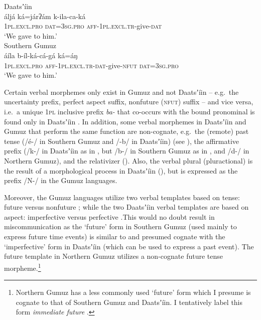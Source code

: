 \documentclass[output=paper]{langsci/langscibook}
\begin{document}
\ea\label{ex:ahlandc:2}
\ea\label{ex:ahlandc:2a} 
Daatsʼíin\\
\gll
áljá                 ká=járʔám        k-ila-ca-ká  \\
\textsc{1pl.excl.pro} \textsc{dat}=\textsc{3sg.pro}   \textsc{aff-1pl.excl.tr-}give-\textsc{dat} \\
\glt ‘We gave to him.’ \\

\ex\label{ex:ahlandc:2b}  
Southern Gumuz \\
\gll
  áíla                 b-íl-ká-cá-gá  ká=áŋ \\
\textsc{1pl.excl.pro} \textsc{aff-1pl.excl.tr-dat-}give-\textsc{nfut}  \textsc{dat=3sg.pro} \\
\glt ‘We gave to him.’
\z
\z

Certain  verbal morphemes only exist in Gumuz and not Daatsʼíin – e.g.\ the uncertainty prefix, perfect aspect suffix, nonfuture (\textsc{nfut)} suffix  \citep{Ahland2012Gumuz} – and  vice versa, i.e.\ a unique 1\textsc{pl} inclusive prefix \textit{ba- }that co-occurs with the bound pronominal is found only in Daatsʼíin . In addition, some verbal morphemes in Daatsʼíin and Gumuz that perform the same function are non-cognate, e.g.\ the (remote) past tense (/é-/ in Southern Gumuz and /-b/ in Daatsʼíin) (see ), the affirmative prefix (/k-/ in Daatsʼíin as in , but /b-/ in Southern Gumuz as in , and /d-/ in Northern Gumuz), and the relativizer (). Also, the verbal plural (pluractional) is the result of a morphological process in Daatsʼíin (), but is expressed as the prefix /N-/ in the Gumuz languages.

Moreover, the Gumuz languages utilize two verbal templates based on tense: future  versus nonfuture ; while the two Daatsʼíin verbal templates are based on aspect: imperfective  versus perfective .This would no doubt result in miscommunication as the ‘future’ form in Southern Gumuz (used mainly to express future time events) is similar to and presumed cognate with the ‘imperfective’ form in Daatsʼíin (which can be used to express a past event). The future template in Northern Gumuz utilizes a non-cognate future tense morpheme.\footnote{Northern Gumuz has a less commonly used ‘future’ form which I presume is cognate to that of Southern Gumuz and Daatsʼíin. I tentatively label this form \textit{immediate future} \citep[233]{Ahland2012Gumuz}.}
\end{document}
